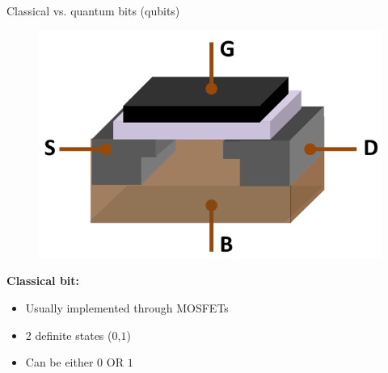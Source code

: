 \documentclass[10pt]{beamer}
\begin{document}
{
\begin{frame}[fragile]{Classical vs. quantum bits (qubits)}

\begin{figure}
\includegraphics[scale=0.3]{MOSFET.png}
\end{figure}
\vspace{-0.3cm}
\flushleft
\textbf{Classical bit:}
\begin{itemize}
\item Usually implemented through MOSFETs
\item 2 definite states ($0$,$1$)
\item Can be either $0$ OR $1$
\end{itemize}

\end{frame}
}
\end{document}

